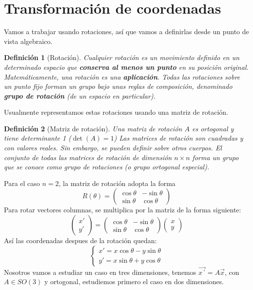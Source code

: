 \documentclass[openany]{book}
\theoremstyle{ucostyle}
\newtheorem{definicion}{Definición}[chapter]
\begin{document}
\section{Transformación de coordenadas}
Vamos a trabajar usando rotaciones, así que vamos a definirlas desde un punto de vista algebraico. 
\begin{definicion}[Rotación]
Cualquier rotación es un movimiento definido en un determinado espacio que \textbf{conserva al menos un punto} en su posición original. Matemáticamente, una rotación es una \textbf{aplicación}. Todas las rotaciones sobre un punto fijo forman un grupo bajo unas reglas de composición, denominado \textbf{grupo de rotación} (de un espacio en particular).
\end{definicion}
Usualmente representamos estas rotaciones usando una matriz de rotación. 
\begin{definicion}[Matriz de rotación]
Una matriz de rotación $A$ es ortogonal y tiene determinante 1 ($\det(A)=1$) Las matrices de rotación son cuadradas y con valores reales. Sin embargo, se pueden definir sobre otros cuerpos. El conjunto de todas las matrices de rotación de dimensión $n\times n$ forma un grupo que se conoce como grupo de rotaciones (o grupo ortogonal especial).
\end{definicion}
Para el caso $n=2$, la matriz de rotación adopta la forma 
\begin{equation*}
    R(\theta)=\begin{pmatrix}
        \cos\theta &-\sin \theta
        \\
        \sin \theta & \cos \theta
    \end{pmatrix}
\end{equation*}
Para rotar vectores columnas, se multiplica por la matriz de la forma siguiente: 
\begin{equation*}
    \begin{pmatrix}
        x' \\
        y' 
    \end{pmatrix}= \begin{pmatrix}
        \cos\theta &-\sin \theta
        \\
        \sin \theta & \cos \theta
    \end{pmatrix}
    \begin{pmatrix}
        x \\
        y 
    \end{pmatrix}
\end{equation*}
Así las coordenadas despues de la rotación quedan: 
\begin{equation}
    \begin{cases}
        x'=x\cos\theta-y\sin\theta 
        \\
        y'=x\sin\theta+y\cos \theta
    \end{cases}
\end{equation}
Nosotros vamos a estudiar un caso en tres dimensiones, tenemos $\vec{x´}=A\vec{x}$, con $A \in SO(3)$ y ortogonal, estudiemos primero el caso en dos dimensiones. 
\\
\end{document}
